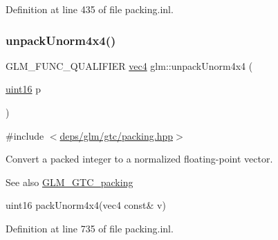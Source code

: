 Definition at line 435 of file packing.\+inl.

\mbox{\label{group__gtc__packing_ga38a0a518d53e15a9481c31dc1e574a40}} 
\subsubsection{\texorpdfstring{unpack\+Unorm4x4()}{unpackUnorm4x4()}}
{\footnotesize\ttfamily G\+L\+M\+\_\+\+F\+U\+N\+C\+\_\+\+Q\+U\+A\+L\+I\+F\+I\+ER \hyperlink{group__core__types_ga5881b1b022d7fd1b7218f5916532dd02}{vec4} glm\+::unpack\+Unorm4x4 (\begin{DoxyParamCaption}\item[{\hyperlink{group__gtc__type__precision_gad8c2939e1fdd8e5828b31d95c52255d5}{uint16}}]{p }\end{DoxyParamCaption})}



{\ttfamily \#include $<$\hyperlink{gtc_2packing_8hpp}{deps/glm/gtc/packing.\+hpp}$>$}

Convert a packed integer to a normalized floating-\/point vector.

\begin{DoxySeeAlso}{See also}
\hyperlink{group__gtc__packing}{G\+L\+M\+\_\+\+G\+T\+C\+\_\+packing} 

uint16 pack\+Unorm4x4(vec4 const\& v) 
\end{DoxySeeAlso}


Definition at line 735 of file packing.\+inl.

